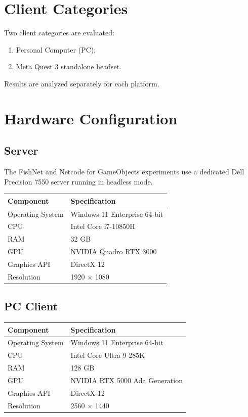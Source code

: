 \documentclass[11pt,a4paper]{article}
\begin{document}
\section{Client Categories}

Two client categories are evaluated:

\begin{enumerate}
\item Personal Computer (PC);
\item Meta Quest 3 standalone headset.
\end{enumerate}

Results are analyzed separately for each platform.

\section{Hardware Configuration}

\subsection{Server}

The FishNet and Netcode for GameObjects experiments use a dedicated Dell Precision 7550 server running in headless mode.

\begin{longtable}{ll}
\toprule
Component & Specification \\
\midrule
Operating System & Windows 11 Enterprise 64-bit \\
CPU & Intel Core i7-10850H \\
RAM & 32 GB \\
GPU & NVIDIA Quadro RTX 3000 \\
Graphics API & DirectX 12 \\
Resolution & 1920 $\times$ 1080 \\
\bottomrule
\end{longtable}

\subsection{PC Client}

\begin{longtable}{ll}
\toprule
Component & Specification \\
\midrule
Operating System & Windows 11 Enterprise 64-bit \\
CPU & Intel Core Ultra 9 285K \\
RAM & 128 GB \\
GPU & NVIDIA RTX 5000 Ada Generation \\
Graphics API & DirectX 12 \\
Resolution & 2560 $\times$ 1440 \\
\bottomrule
\end{longtable}
\end{document}
